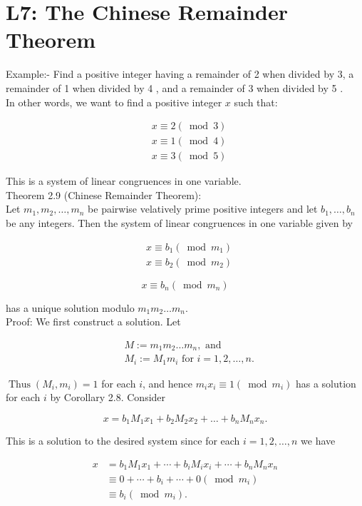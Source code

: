 \documentclass[10pt]{article}
\begin{document}
\section*{L7: The Chinese Remainder Theorem}
Example:- Find a positive integer having a remainder of 2 when divided by 3, a remainder of 1 when divided by 4 , and a remainder of 3 when divided by 5 .\\
In other words, we want to find a positive integer $x$ such that:

$$
\begin{aligned}
& x \equiv 2(\bmod 3) \\
& x \equiv 1(\bmod 4) \\
& x \equiv 3(\bmod 5)
\end{aligned}
$$

This is a system of linear congruences in one variable.\\
Theorem 2.9 (Chinese Remainder Theorem):\\
Let $m_{1}, m_{2}, \ldots, m_{n}$ be pairwise velatively prime positive integers and let $b_{1}, \ldots, b_{n}$ be any integers. Then the system of linear congruences in one variable given by

$$
\begin{aligned}
& x \equiv b_{1}\left(\bmod m_{1}\right) \\
& x \equiv b_{2}\left(\bmod m_{2}\right)
\end{aligned}
$$

$$
x \equiv b_{n}\left(\bmod m_{n}\right)
$$

has a unique solution modulo $m_{1} m_{2} \ldots m_{n}$.\\
Proof: We first construct a solution. Let

$$
\begin{aligned}
& M:=m_{1} m_{2} \ldots m_{n}, \text { and } \\
& M_{i}:=M_{1} m_{i} \text { for } i=1,2, \ldots, n .
\end{aligned}
$$

$\operatorname{Thus}\left(M_{i}, m_{i}\right)=1$ for each $i$, and hence $m_{i} x_{i} \equiv 1\left(\bmod m_{i}\right)$ has a solution for each $i$ by Corollary 2.8. Consider

$$
x=b_{1} M_{1} x_{1}+b_{2} M_{2} x_{2}+\ldots+b_{n} M_{n} x_{n} .
$$

This is a solution to the desired system since for each $i=1,2, \ldots, n$ we have

$$
\begin{aligned}
x & =b_{1} M_{1} x_{1}+\cdots+b_{i} M_{i} x_{i}+\cdots+b_{n} M_{n} x_{n} \\
& \equiv 0+\cdots+b_{i}+\cdots+0\left(\bmod m_{i}\right) \\
& \equiv b_{i}\left(\bmod m_{i}\right) .
\end{aligned}
$$
\end{document}
